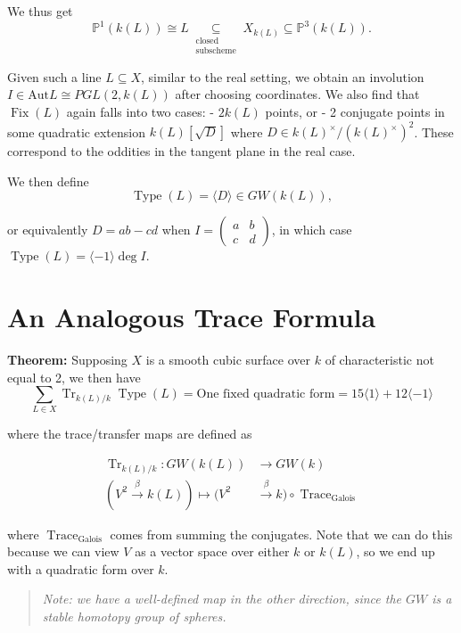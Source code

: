 \documentclass[11pt]{scrreprt}
\theoremstyle{definition}
\newcommand{\PP}[0]{{\mathbb{P}}}
\newcommand{\mapsvia}[1]{\xrightarrow{#1}}
\newcommand{\generators}[1]{\langle{#1}\rangle}
\newcommand{\Aut}[0]{{\text{Aut}}}
\begin{document}
We thus get \[
\PP^1(k(L)) \cong L \underset{\substack{\text{closed}\\\text{subscheme}}}\subseteq X_{k(L)} \subseteq \PP^3(k(L)).
\]

Given such a line \(L\subseteq X\), similar to the real setting, we
obtain an involution \(I \in \Aut L \cong PGL(2, k(L))\) after choosing
coordinates. We also find that \(\operatorname{Fix}(L)\) again falls into two
cases: - \(2 k(L)\) points, or - 2 conjugate points in some quadratic
extension \(k(L)[\sqrt D]\) where
\(D \in k(L)^\times / (k(L)^\times)^2\). These correspond to the
oddities in the tangent plane in the real case.

We then define \[
\operatorname{Type}(L) = \generators{D} \in GW(k(L)),
\]

or equivalently \(D=ab-cd\) when
\(I = \begin{pmatrix}a&b\\c&d\end{pmatrix}\), in which case
\(\operatorname{Type}(L) = \generators{-1}\deg I\).

\hypertarget{an-analogous-trace-formula}{%
\section{An Analogous Trace Formula}\label{an-analogous-trace-formula}}

\textbf{Theorem:} Supposing \(X\) is a smooth cubic surface over \(k\)
of characteristic not equal to 2, we then have \[
\sum_{L \in X}\operatorname{Tr}_{k(L) / k}\operatorname{Type}(L) = \text{One fixed quadratic form} = 15\generators{1} + 12\generators{-1}
\]

where the trace/transfer maps are defined as

\begin{align*}
\operatorname{Tr}_{k(L) / k}: GW(k(L)) &\to GW(k) \\
(V^2 \mapsvia{\beta} k(L)) \mapsto (V^2 &\mapsvia{\beta} k) \circ \operatorname{Trace}_\text{Galois}
\end{align*}

where \(\operatorname{Trace}_\text{Galois}\) comes from summing the
conjugates. Note that we can do this because we can view \(V\) as a
vector space over either \(k\) or \(k(L)\), so we end up with a
quadratic form over \(k\).

\begin{quote}\textit{
Note: we have a well-defined map in the other direction, since the
\(GW\) is a stable homotopy group of spheres.
}\end{quote}
\end{document}
